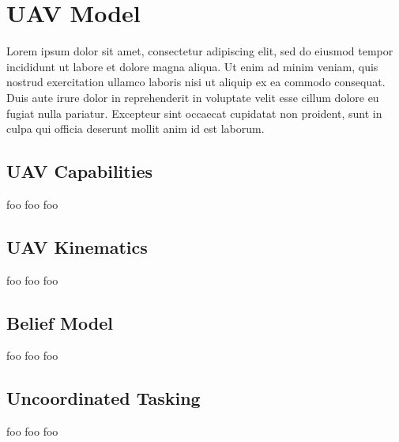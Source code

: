 \chapter{UAV Model}
Lorem ipsum dolor sit amet, consectetur adipiscing elit, sed do eiusmod tempor incididunt ut labore et dolore magna aliqua. Ut enim ad minim veniam, quis nostrud exercitation ullamco laboris nisi ut aliquip ex ea commodo consequat. Duis aute irure dolor in reprehenderit in voluptate velit esse cillum dolore eu fugiat nulla pariatur. Excepteur sint occaecat cupidatat non proident, sunt in culpa qui officia deserunt mollit anim id est laborum.

\section{UAV Capabilities}
foo foo foo
\section{UAV Kinematics}
foo foo foo
\section{Belief Model}
\label{sec:uavBelief}
foo foo foo
\section{Uncoordinated Tasking}
foo foo foo